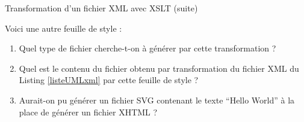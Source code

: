 \begin{frame}{Transformation d'un fichier XML avec XSLT (suite)}

Voici une autre feuille de style :

\begin{center}
\begin{minipage}{0.7\textwidth}

\end{minipage}
\end{center}

\begin{small}
\begin{exoblock}
\begin{enumerate}
\item Quel type de fichier cherche-t-on \`a g\'en\'erer par cette transformation ? 
\item Quel est le contenu du fichier  obtenu par transformation du fichier XML du Listing \ref{listeUMLxml} par cette feuille de style ?
\item Aurait-on pu g\'en\'erer un fichier SVG contenant le texte ``Hello World'' \`a la place de g\'en\'erer un fichier XHTML ? 
\end{enumerate}
\end{exoblock}
\end{small}

\end{frame}

